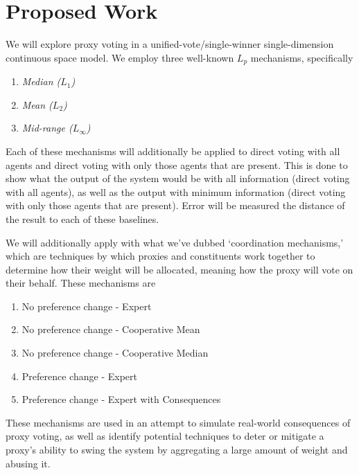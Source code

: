 \section{Proposed Work}\label{sec:contribution}
We will explore proxy voting in a unified-vote/single-winner single-dimension
continuous space model.
We employ three well-known $L_p$ mechanisms, specifically
\begin{enumerate}
    \item {
        \textit{Median ($L_1$)}
    }
    \item {
        \textit{Mean ($L_2$)}
    }
    \item {
        \textit{Mid-range ($L_\infty$)}
    }
\end{enumerate}
Each of these mechanisms will additionally be applied to direct voting with all
agents and direct voting with only those agents that are present.
This is done to show what the output of the system would be with all information
(direct voting with all agents), as well as the output with minimum information
(direct voting with only those agents that are present).
Error will be measured the distance of the result to each of these baselines.

We will additionally apply with what we've dubbed `coordination mechanisms,' which
are techniques by which proxies and constituents work together to determine how their
weight will be allocated, meaning how the proxy will vote on their behalf.
These mechanisms are
\begin{enumerate}
    \item {
        No preference change - Expert
    }
    \item {
        No preference change - Cooperative Mean
    }
    \item {
        No preference change - Cooperative Median
    }
    \item {
        Preference change - Expert
    }
    \item {
        Preference change - Expert with Consequences
    }
\end{enumerate}
These mechanisms are used in an attempt to simulate real-world consequences of proxy
voting, as well as identify potential techniques to deter or mitigate a proxy's
ability to swing the system by aggregating a large amount of weight and abusing it.

